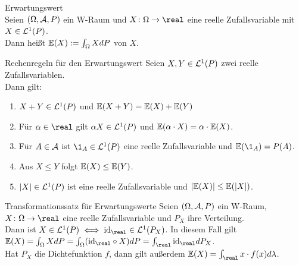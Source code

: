 \begin{Def}{Erwartungswert}\\
    Seien $(\Omega, \mathcal{A}, P)$ ein W-Raum und $X\colon \Omega \rightarrow \real$ eine reelle
    Zufallsvariable mit $X \in \mathcal{L}^1(P)$.\\
    Dann heißt $\mathbb{E}(X) := \int_\Omega X dP$  von $X$.
\end{Def}

\begin{Satz}{Rechenregeln für den Erwartungswert}
    Seien $X, Y \in \mathcal{L}^1(P)$ zwei reelle Zufallsvariablen.\\
    Dann gilt:
    \begin{enumerate}
        \item
        $X + Y \in \mathcal{L}^1(P)$ und $\mathbb{E}(X + Y) = \mathbb{E}(X) + \mathbb{E}(Y)$
        
        \item
        Für $\alpha \in \real$ gilt $\alpha X \in \mathcal{L}^1(P)$ und
        $\mathbb{E}(\alpha \cdot X) = \alpha \cdot \mathbb{E}(X)$.
        
        \item
        Für $A \in \mathcal{A}$ ist $\1_A \in \L^1(P)$ eine reelle Zufallsvariable und
        $\EW(\1_A) = P(A)$.
        
        \item
        Aus $X \le Y$ folgt $\mathbb{E}(X) \le \mathbb{E}(Y)$.
        
        \item
        $|X| \in \mathcal{L}^1(P)$ ist eine reelle Zufallsvariable und $|\mathbb{E}(X)| \le \mathbb{E}(|X|)$.
    \end{enumerate}
\end{Satz}

\begin{Satz}{Transformationssatz für Erwartungswerte}
    Seien $(\Omega, \mathcal{A}, P)$ ein W-Raum, $X\colon \Omega \rightarrow \real$ eine reelle
    Zufallsvariable und $P_X$ ihre Verteilung.\\
    Dann ist $X \in \L^1(P) \iff \id_\real \in \L^1(P_X)$.
    In diesem Fall gilt
    $\EW(X) = \int_\Omega X dP = \int_\Omega (\id_\real \circ X) dP =
    \int_\real \id_\real dP_X$.\\
    Hat $P_X$ die Dichtefunktion $f$, dann gilt außerdem
    $\EW(X) = \int_\real x \cdot f(x) d\lambda$.
\end{Satz}

